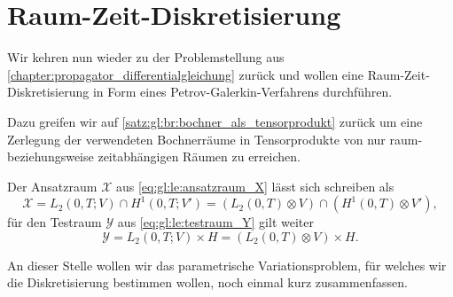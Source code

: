 
\section{Raum-Zeit-Diskretisierung} %
\label{sub:raum_zeit_diskretisierung}

Wir kehren nun wieder zu der Problemstellung aus \cref{chapter:propagator_differentialgleichung} zurück und wollen eine Raum-Zeit-Diskretisierung in Form eines Petrov-Galerkin-Verfahrens durchführen.

Dazu greifen wir auf \cref{satz:gl:br:bochner_als_tensorprodukt} zurück um eine Zerlegung der verwendeten Bochnerräume in Tensorprodukte von nur raum- beziehungsweise zeitabhängigen Räumen zu erreichen.

\begin{Korollar}
    Der Ansatzraum $\mathcal X$ aus \cref{eq:gl:le:ansatzraum_X} lässt sich schreiben als
    \begin{equation}
        \label{eq:gal:ansatzraum_tensor}
        \mathcal X = L_{2}(0, T; V) \cap H^{1}(0, T; V')
            = (L_2(0, T) \otimes V) \cap (H^{1}(0, T) \otimes V'),
    \end{equation}
    für den Testraum $\mathcal Y$ aus \cref{eq:gl:le:testraum_Y} gilt weiter
    \begin{equation}
        \label{eq:gal:testraum_tensor}
        \mathcal Y = L_{2}(0, T; V) \times H = (L_{2}(0, T) \otimes V) \times H.
    \end{equation}
\end{Korollar}

An dieser Stelle wollen wir das parametrische Variationsproblem, für welches wir die Diskretisierung bestimmen wollen, noch einmal kurz zusammenfassen.

\begin{Bemerkung}
\end{Bemerkung}

